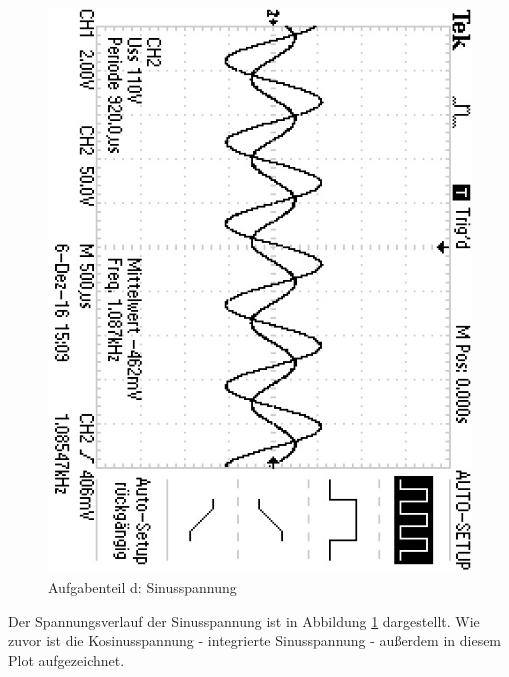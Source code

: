\begin{figure}
	\centering
	\includegraphics[angle=90]{bilder/ALL0002/F0002TEK.JPG}
	\caption{Aufgabenteil d: Sinusspannung}
	\label{fig:sinus}
\end{figure}

Der Spannungsverlauf der Sinusspannung ist in Abbildung \ref{fig:sinus} dargestellt. Wie zuvor ist die Kosinusspannung - integrierte Sinusspannung - außerdem in diesem Plot aufgezeichnet.


